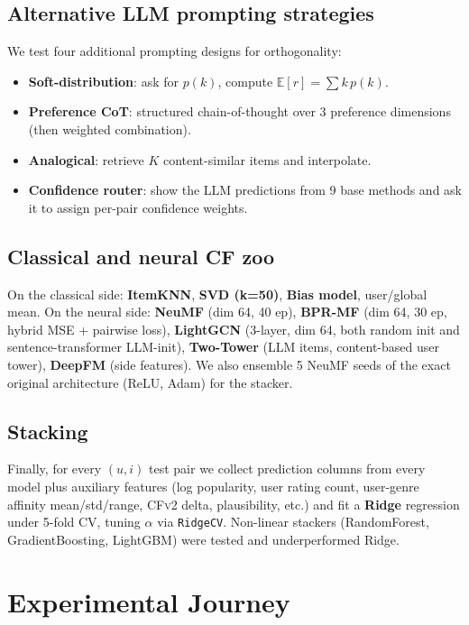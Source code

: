 \documentclass[11pt,a4paper]{article}
\begin{document}
\subsection{Alternative LLM prompting strategies}
We test four additional prompting designs for orthogonality:
\begin{itemize}[leftmargin=1.5em,itemsep=1pt]
\item \textbf{Soft-distribution}: ask for $p(k)$, compute
      $\mathbb{E}[r] = \sum k\,p(k)$.
\item \textbf{Preference CoT}: structured chain-of-thought over
      3 preference dimensions (then weighted combination).
\item \textbf{Analogical}: retrieve $K$ content-similar items and
      interpolate.
\item \textbf{Confidence router}: show the LLM predictions from 9
      base methods and ask it to assign per-pair confidence weights.
\end{itemize}

\subsection{Classical and neural CF zoo}
On the classical side: \textbf{ItemKNN}, \textbf{SVD (k=50)},
\textbf{Bias model}, user/global mean. On the neural side:
\textbf{NeuMF} (dim 64, 40 ep), \textbf{BPR-MF} (dim 64, 30 ep, hybrid
MSE + pairwise loss), \textbf{LightGCN} (3-layer, dim 64, both random
init and sentence-transformer LLM-init), \textbf{Two-Tower} (LLM items,
content-based user tower), \textbf{DeepFM} (side features). We also
ensemble 5 NeuMF seeds of the exact original architecture
(ReLU, Adam) for the stacker.

\subsection{Stacking}
Finally, for every $(u,i)$ test pair we collect prediction columns from
every model plus auxiliary features (log popularity, user rating count,
user-genre affinity mean/std/range, \textsc{CFv2} delta, plausibility,
etc.) and fit a \textbf{Ridge} regression under 5-fold CV, tuning $\alpha$
via \texttt{RidgeCV}. Non-linear stackers (RandomForest, GradientBoosting,
LightGBM) were tested and underperformed Ridge.

\section{Experimental Journey}
\label{sec:journey}
\end{document}
